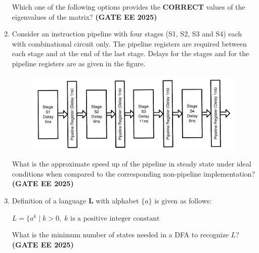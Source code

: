 \documentclass[journal,12pt,onecolumn]{IEEEtran}
\theoremstyle{remark}
\begin{document}
\begin{enumerate}
Which one of the following options provides the \textbf{CORRECT} values of the eigenvalues of the matrix? \hfill \textbf{(GATE EE 2025)} 

\begin{enumerate}
\end{enumerate}


\item  Consider an instruction pipeline with four stages (S1, S2, S3 and S4) each with combinational circuit only. The pipeline registers are required between each stage and at the end of the last stage. Delays for the stages and for the pipeline registers are as given in the figure.  
\begin{figure}
    \centering
    \includegraphics[width=0.5\linewidth]{figs/fig6.png}
    \caption{}
    \label{fig6}
\end{figure}


What is the approximate speed up of the pipeline in steady state under ideal conditions when compared to the corresponding non-pipeline implementation? \hfill \textbf{(GATE EE 2025)} 

\begin{enumerate}
\end{enumerate}


\item  Definition of a language \textbf{L} with alphabet \(\{a\}\) is given as follows:

$L = \{ a^{k} \mid k > 0, \; k \text{ is a positive integer constant} $

What is the minimum number of states needed in a DFA to recognize \(L\)? \hfill \textbf{(GATE EE 2025)} 


\end{enumerate}
\end{document}
